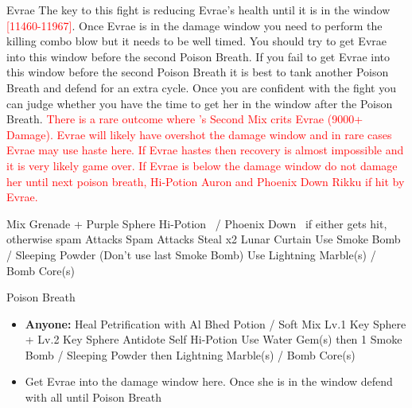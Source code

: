 \begin{battle}[32000]{Evrae}
	The key to this fight is reducing Evrae's health until it is in the window \textcolor{Red}{[11460-11967]}. Once Evrae is in the damage window you need to perform the killing combo blow but it needs to be well timed. You should try to get Evrae into this window before the second Poison Breath. If you fail to get Evrae into this window before the second Poison Breath it is best to tank another Poison Breath and defend for an extra cycle. Once you are confident with the fight you can judge whether you have the time to get her in the window after the Poison Breath.\newline
	\vspace{\baselineskip}
	\textcolor{Red}{There is a rare outcome where \rikku 's Second Mix crits Evrae (9000+ Damage). Evrae will likely have overshot the damage window and in rare cases Evrae may use haste here. If Evrae hastes then recovery is almost impossible and it is very likely game over. If Evrae is below the damage window do not damage her until next poison breath, Hi-Potion Auron and Phoenix Down Rikku if hit by Evrae.}
	\vspace{\baselineskip}
	\begin{itemize}
		\switch{\tidus}{\rikku}
		\rikkuf Mix Grenade + Purple Sphere
		\kimahrif Hi-Potion \auron\ / Phoenix Down \rikku\ if either gets hit, otherwise spam Attacks
		\auronf Spam Attacks
		\rikkuf Steal x2
		\rikkuf Lunar Curtain \auron
		\rikkuf Use Smoke Bomb / Sleeping Powder (Don't use last Smoke Bomb)
		\rikkuf Use Lightning Marble(s) / Bomb Core(s)
	\end{itemize}
	\vspace{\baselineskip}
	\begin{itemize}
		\enemyf Poison Breath
	\end{itemize}
	\vspace{\baselineskip}
	\begin{itemize}
		\switch{\auron}{\tidus}
		\tidusf Phoenix Down \rikku
		\tidusf Phoenix Down \kimahri
		\item \textbf{Anyone:} Heal Petrification with Al Bhed Potion / Soft
		\rikkuf Mix Lv.1 Key Sphere + Lv.2 Key Sphere
		\switch{\tidus}{\auron}
		\auronf Antidote Self
		\kimahrif Hi-Potion \auron
		\rikkuf Use Water Gem(s) then 1 Smoke Bomb / Sleeping Powder then Lightning Marble(s) / Bomb Core(s)
		\item Get Evrae into the damage window here. Once she is in the window defend with all until Poison Breath
	\end{itemize}

\end{battle}
